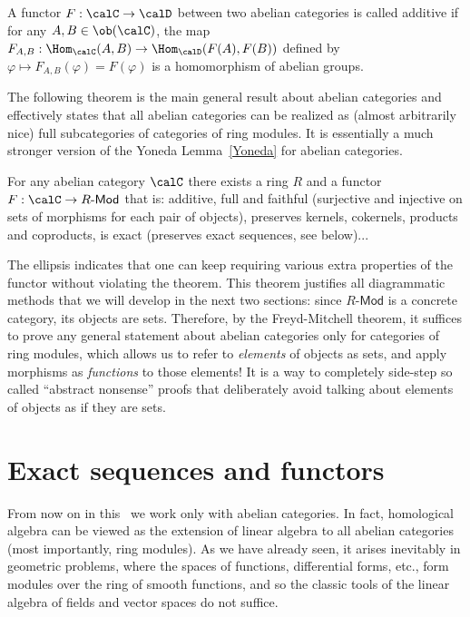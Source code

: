 \begin{defn}
    A functor $F:\calC\to\calD$ between two abelian categories is called additive if for any $A,B\in\ob(\calC)$, the map $F_{A,B}:\Hom_\calC(A,B)\to \Hom_\calD(F(A),F(B))$ defined by $\varphi\mapsto F_{A,B}(\varphi)=F(\varphi)$ is a homomorphism of abelian groups.
\end{defn}

The following theorem is the main general result about abelian categories and effectively states that all abelian categories can be realized as (almost arbitrarily nice) full subcategories of categories of ring modules. It is essentially a much stronger version of the Yoneda Lemma~\ref{Yoneda} for abelian categories.

\begin{thm}\label{Theorem!Freyd-Mitchell}
    For any abelian category $\calC$ there exists a ring $R$ and a functor $F:\calC\to R\text{-}\mathsf{Mod}$ that is: additive, full and faithful (surjective and injective on sets of morphisms for each pair of objects), preserves kernels, cokernels, products and coproducts, is exact (preserves exact sequences, see below)...
\end{thm}
The ellipsis indicates that one can keep requiring various extra properties of the functor without violating the theorem. This theorem justifies all diagrammatic methods that we will develop in the next two sections: since $R\text{-}\mathsf{Mod}$ is a concrete category, its objects are sets. Therefore, by the Freyd-Mitchell theorem, it suffices to prove any general statement about abelian categories only for categories of ring modules, which allows us to refer to \emph{elements} of objects as sets, and apply morphisms as \emph{functions} to those elements! It is a way to completely side-step so called ``abstract nonsense'' proofs that deliberately avoid talking about elements of objects as if they are sets.




\section{Exact sequences and functors}

From now on in this \partt\ we work only with abelian categories. In fact, homological algebra can be viewed as the extension of linear algebra to all abelian categories (most importantly, ring modules). As we have already seen, it arises inevitably in geometric problems, where the spaces of functions, differential forms, etc., form modules over the ring of smooth functions, and so the classic tools of the linear algebra of fields and vector spaces do not suffice.

